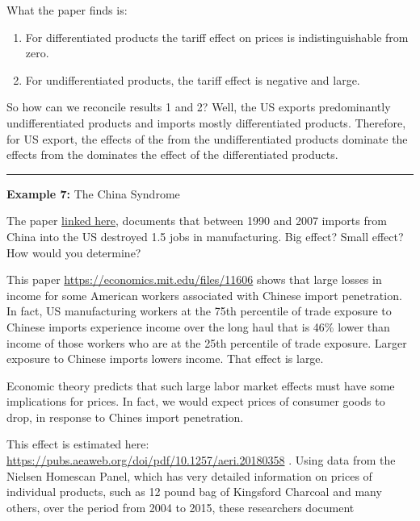 \documentclass[
]{book}
\begin{document}
What the paper finds is:

\begin{enumerate}
\def\labelenumi{\arabic{enumi}.}
\setcounter{enumi}{2}
\item
  For differentiated products the tariff effect on prices is indistinguishable from zero.
\item
  For undifferentiated products, the tariff effect is negative and large.
\end{enumerate}

So how can we reconcile results 1 and 2? Well, the US exports predominantly undifferentiated products and imports mostly differentiated products. Therefore, for US export, the effects of the from the undifferentiated products dominate the effects from the dominates the effect of the differentiated products.

\begin{center}\rule{0.5\linewidth}{0.5pt}\end{center}

\textbf{Example 7:} The China Syndrome

The paper \href{https://pubs.aeaweb.org/doi/pdf/10.1257/aer.103.6.2121}{linked here}, documents that between 1990 and 2007 imports from China into the US destroyed 1.5 jobs in manufacturing. Big effect? Small effect? How would you determine?

This paper \url{https://economics.mit.edu/files/11606} shows that large losses in income for some American workers associated with Chinese import penetration. In fact, US manufacturing workers at the 75th percentile of trade exposure to Chinese imports experience income over the long haul that is 46\% lower than income of those workers who are at the 25th percentile of trade exposure. Larger exposure to Chinese imports lowers income. That effect is large.

Economic theory predicts that such large labor market effects must have some implications for prices. In fact, we would expect prices of consumer goods to drop, in response to Chines import penetration.

This effect is estimated here: \url{https://pubs.aeaweb.org/doi/pdf/10.1257/aeri.20180358} . Using data from the Nielsen Homescan Panel, which has very detailed information on prices of individual products, such as 12 pound bag of Kingsford Charcoal and many others, over the period from 2004 to 2015, these researchers document
\end{document}

